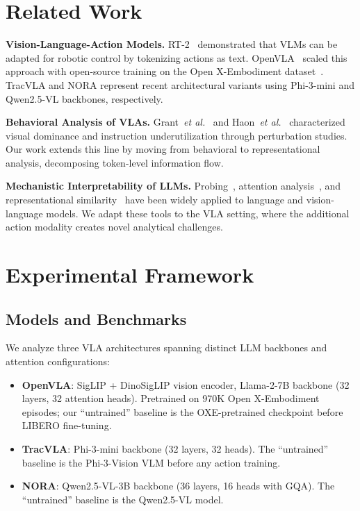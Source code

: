 \documentclass[10pt,twocolumn]{article}
\newcommand{\etal}{\emph{et al.}}
\begin{document}
\section{Related Work}
\label{sec:related}

\textbf{Vision-Language-Action Models.}
RT-2~\citep{brohan2023rt2} demonstrated that VLMs can be adapted for robotic control by tokenizing actions as text.
OpenVLA~\citep{kim2024openvla} scaled this approach with open-source training on the Open X-Embodiment dataset~\citep{open_x_embodiment_rt_x_2023}.
TracVLA and NORA represent recent architectural variants using Phi-3-mini and Qwen2.5-VL backbones, respectively.

\textbf{Behavioral Analysis of VLAs.}
Grant~\etal~\citep{grant2026behavioral} and Haon~\etal~\citep{haon2025behavioral} characterized visual dominance and instruction underutilization through perturbation studies.
Our work extends this line by moving from behavioral to representational analysis, decomposing token-level information flow.

\textbf{Mechanistic Interpretability of LLMs.}
Probing~\citep{alain2017understanding,hewitt2019structural}, attention analysis~\citep{clark2019does}, and representational similarity~\citep{kornblith2019similarity,kriegeskorte2008representational} have been widely applied to language and vision-language models.
We adapt these tools to the VLA setting, where the additional action modality creates novel analytical challenges.


\section{Experimental Framework}
\label{sec:method}

\subsection{Models and Benchmarks}

We analyze three VLA architectures spanning distinct LLM backbones and attention configurations:

\begin{itemize}
  \item \textbf{OpenVLA}: SigLIP + DinoSigLIP vision encoder, Llama-2-7B backbone (32 layers, 32 attention heads). Pretrained on 970K Open X-Embodiment episodes; our ``untrained'' baseline is the OXE-pretrained checkpoint before LIBERO fine-tuning.
  \item \textbf{TracVLA}: Phi-3-mini backbone (32 layers, 32 heads). The ``untrained'' baseline is the Phi-3-Vision VLM before any action training.
  \item \textbf{NORA}: Qwen2.5-VL-3B backbone (36 layers, 16 heads with GQA). The ``untrained'' baseline is the Qwen2.5-VL model.
\end{itemize}
\end{document}
